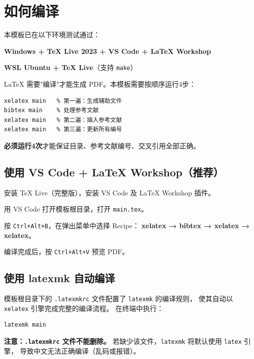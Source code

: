 \section{如何编译}

本模板已在以下环境测试通过：
\begin{compactitem}
    \item \textbf{Windows + TeX Live 2023 + VS Code + LaTeX Workshop}
    \item \textbf{WSL Ubuntu + TeX Live}（支持 \texttt{make}）
\end{compactitem}

\LaTeX{} 需要"编译"才能生成 PDF。本模板需要按顺序运行4步：

\begin{verbatim}
xelatex main   % 第一遍：生成辅助文件
bibtex main    % 处理参考文献
xelatex main   % 第二遍：插入参考文献
xelatex main   % 第三遍：更新所有编号
\end{verbatim}

\textbf{必须运行4次}才能保证目录、参考文献编号、交叉引用全部正确。

\subsection{使用 VS Code + LaTeX Workshop（推荐）}

\begin{compactenum}
    \item 安装 TeX Live（完整版），安装 VS Code 及 LaTeX Workshop 插件。
    \item 用 VS Code 打开模板根目录，打开 \texttt{main.tex}。
    \item 按 \texttt{Ctrl+Alt+B}，在弹出菜单中选择 Recipe：
          \textbf{xelatex → bibtex → xelatex → xelatex}。
    \item 编译完成后，按 \texttt{Ctrl+Alt+V} 预览 PDF。
\end{compactenum}

\subsection{使用 latexmk 自动编译}

模板根目录下的 \texttt{.latexmkrc} 文件配置了 \texttt{latexmk} 的编译规则，
使其自动以 \texttt{xelatex} 引擎完成完整的编译流程。
在终端中执行：

\begin{verbatim}
latexmk main
\end{verbatim}

\textbf{注意：\texttt{.latexmkrc} 文件不能删除。}
若缺少该文件，\texttt{latexmk} 将默认使用 \texttt{latex} 引擎，
导致中文无法正确编译（乱码或报错）。

